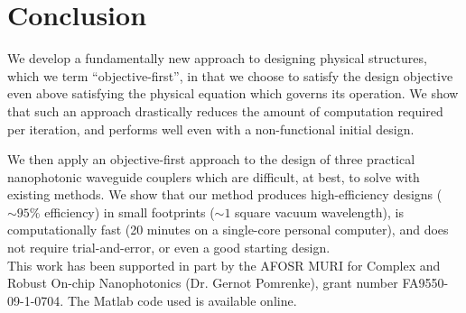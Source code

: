 \documentclass[letterpaper,10pt]{article}
\begin{document}
\section{Conclusion}
We develop a fundamentally new approach to designing physical structures,
    which we term ``objective-first'', 
    in that we choose to satisfy the design objective 
    even above satisfying the physical equation which governs its operation.
We show that such an approach drastically reduces the
    amount of computation required per iteration, and 
    performs well even with a non-functional initial design.

We then apply an objective-first approach to the design of 
    three practical nanophotonic waveguide couplers which are difficult, 
    at best, to solve with existing methods. 
We show that our method produces
    high-efficiency designs ($\sim 95\%$ efficiency) 
    in small footprints ($\sim 1$ square vacuum wavelength),
    is computationally fast (20 minutes on a single-core personal computer), and
    does not require trial-and-error, or even 
    a good starting design.\\


This work has been supported in part by the 
    AFOSR MURI for Complex and Robust On-chip Nanophotonics 
    (Dr. Gernot Pomrenke), grant number FA9550-09-1-0704.
The Matlab code used is available online\cite{code}.
\end{document}
